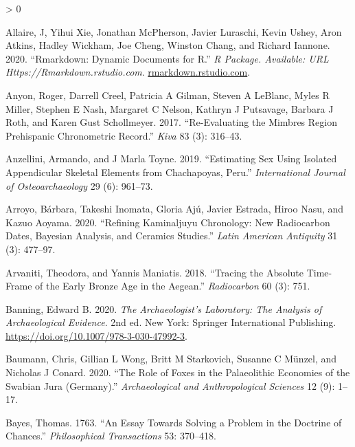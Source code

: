 \documentclass[
]{article}
\newlength{\cslhangindent}
\newenvironment{CSLReferences}[2] %
 {%
  \setlength{\parindent}{0pt}
  \ifodd #1 \everypar{\setlength{\hangindent}{\cslhangindent}}\ignorespaces\fi
  \ifnum #2 > 0
  \setlength{\parskip}{#2\baselineskip}
  \fi
 }%
 {}
\begin{document}
\hypertarget{refs}{}
\begin{CSLReferences}{1}{0}
\leavevmode\hypertarget{ref-allaire_rmarkdown_2020}{}%
Allaire, J, Yihui Xie, Jonathan McPherson, Javier Luraschi, Kevin Ushey,
Aron Atkins, Hadley Wickham, Joe Cheng, Winston Chang, and Richard
Iannone. 2020. {``Rmarkdown: {Dynamic} {Documents} for {R}.''} \emph{R
Package. Available: URL Https://Rmarkdown.rstudio.com}.
\href{https://rmarkdown.rstudio.com}{rmarkdown.rstudio.com}.

\leavevmode\hypertarget{ref-anyon_re-evaluating_2017}{}%
Anyon, Roger, Darrell Creel, Patricia A Gilman, Steven A LeBlanc, Myles
R Miller, Stephen E Nash, Margaret C Nelson, Kathryn J Putsavage,
Barbara J Roth, and Karen Gust Schollmeyer. 2017. {``Re-Evaluating the
{Mimbres} {Region} {Prehispanic} {Chronometric} {Record}.''} \emph{Kiva}
83 (3): 316--43.

\leavevmode\hypertarget{ref-anzellini_estimating_2019}{}%
Anzellini, Armando, and J Marla Toyne. 2019. {``Estimating Sex Using
Isolated Appendicular Skeletal Elements from {Chachapoyas}, {Peru}.''}
\emph{International Journal of Osteoarchaeology} 29 (6): 961--73.

\leavevmode\hypertarget{ref-arroyo_refining_2020}{}%
Arroyo, Bárbara, Takeshi Inomata, Gloria Ajú, Javier Estrada, Hiroo
Nasu, and Kazuo Aoyama. 2020. {``Refining {Kaminaljuyu} {Chronology}:
{New} {Radiocarbon} {Dates}, {Bayesian} {Analysis}, and {Ceramics}
{Studies}.''} \emph{Latin American Antiquity} 31 (3): 477--97.

\leavevmode\hypertarget{ref-arvaniti_tracing_2018}{}%
Arvaniti, Theodora, and Yannis Maniatis. 2018. {``Tracing the Absolute
Time-Frame of the {Early} {Bronze} {Age} in the {Aegean}.''}
\emph{Radiocarbon} 60 (3): 751.

\leavevmode\hypertarget{ref-banning_archaeologists_2020}{}%
Banning, Edward B. 2020. \emph{The {Archaeologist}'s {Laboratory}: {The}
{Analysis} of {Archaeological} {Evidence}}. 2nd ed. New York: Springer
International Publishing.
\url{https://doi.org/10.1007/978-3-030-47992-3}.

\leavevmode\hypertarget{ref-baumann_role_2020}{}%
Baumann, Chris, Gillian L Wong, Britt M Starkovich, Susanne C Münzel,
and Nicholas J Conard. 2020. {``The Role of Foxes in the {Palaeolithic}
Economies of the {Swabian} {Jura} ({Germany}).''} \emph{Archaeological
and Anthropological Sciences} 12 (9): 1--17.

\leavevmode\hypertarget{ref-bayes_essay_1763}{}%
Bayes, Thomas. 1763. {``An Essay Towards Solving a Problem in the
Doctrine of Chances.''} \emph{Philosophical Transactions} 53: 370--418.


\end{CSLReferences}
\end{document}
